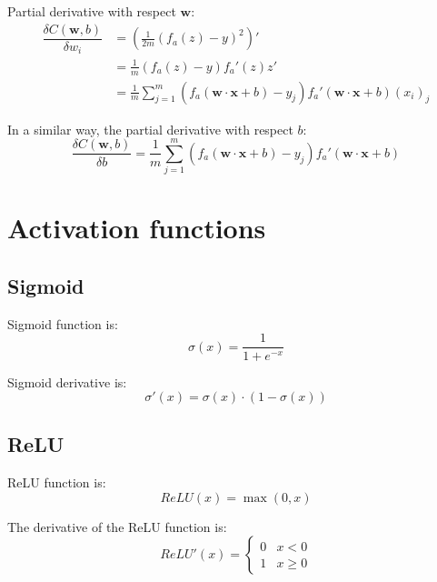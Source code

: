 \documentclass{article}
\begin{document}
Partial derivative with respect $\mathbf{w}$:
\begin{align}
  \dfrac{\delta C(\mathbf{w},b)}{\delta w_i}
  &= \left( \frac{1}{2m} \left(f_a(z) - y\right)^2 \right)' \nonumber \\
  &= \frac{1}{m} \left(f_a(z) - y\right) f_a'(z) z' \nonumber \\
  &= \frac{1}{m} \sum_{j=1}^m \left(f_a(\mathbf{w \cdot x} + b) - y_j\right) f_a'(\mathbf{w \cdot x} + b) (x_i)_j
\end{align}

In a similar way, the partial derivative with respect $b$:
\begin{equation}
  \dfrac{\delta C(\mathbf{w},b)}{\delta b} = \frac{1}{m} \sum_{j=1}^m \left(f_a(\mathbf{w \cdot x} + b) - y_j\right) f_a'(\mathbf{w \cdot x} + b)
\end{equation}

\section*{Activation functions}

\subsection*{Sigmoid}

Sigmoid function is:
\begin{equation}
  \sigma(x) = \frac{1}{1 + e^{-x}}
\end{equation}

Sigmoid derivative is:
\begin{equation}
  \sigma'(x) = \sigma(x) \cdot (1 - \sigma(x))  
\end{equation}

\subsection*{ReLU}

ReLU function is:
\begin{equation}
  ReLU(x) = \max(0,x)
\end{equation}

The derivative of the ReLU function is:
\begin{equation}
  ReLU'(x) = \begin{cases} 
    0 & x < 0 \\
    1 & x\geq 0 
  \end{cases}
\end{equation}
\end{document}
